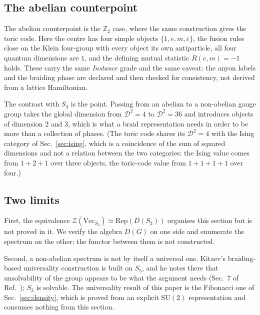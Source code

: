 \documentclass[aps,prx,nofootinbib,superscriptaddress,12pt]{revtex4-2}
\begin{document}
\subsection{The abelian counterpoint}

The abelian counterpoint is the $\mathbb{Z}_2$ case, where the same
construction gives the toric code. Here the centre has four simple
objects $\{1, e, m, \varepsilon\}$, the fusion rules close on the Klein
four-group with every object its own antiparticle, all four quantum
dimensions are $1$, and the defining mutual statistic $R(e,m) = -1$
holds. These carry the same \emph{Instance} grade and the same caveat:
the anyon labels and the braiding phase are declared and then checked
for consistency, not derived from a lattice Hamiltonian.

The contrast with $S_3$ is the point. Passing from an abelian to a
non-abelian gauge group takes the global dimension from
$\mathcal{D}^2 = 4$ to $\mathcal{D}^2 = 36$ and introduces objects of
dimension $2$ and $3$, which is what a braid representation needs in
order to be more than a collection of phases. (The toric code shares its
$\mathcal{D}^2 = 4$ with the Ising category of Sec.~\ref{sec:ising},
which is a coincidence of the sum of squared dimensions and not a
relation between the two categories: the Ising value comes from
$1 + 2 + 1$ over three objects, the toric-code value from $1+1+1+1$ over
four.)

\subsection{Two limits}

First, the equivalence
$\mathcal{Z}(\mathrm{Vec}_{S_3}) \simeq \mathrm{Rep}(D(S_3))$ organises
this section but is not proved in it. We verify the algebra $D(G)$ on
one side and enumerate the spectrum on the other; the functor between
them is not constructed.

Second, a non-abelian spectrum is not by itself a universal one.
Kitaev's braiding-based universality construction is built on $S_5$, and
he notes there that unsolvability of the group appears to be what the
argument needs (Sec.~7 of Ref.~\cite{KitaevAnyons2003}); $S_3$ is
solvable. The universality result of this paper is the Fibonacci one of
Sec.~\ref{sec:density}, which is proved from an explicit
$\mathrm{SU}(2)$ representation and consumes nothing from this section.

\end{document}

